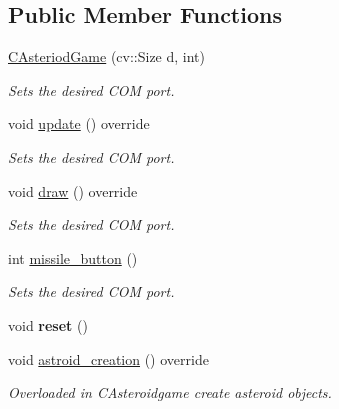 \subsection*{Public Member Functions}
\begin{DoxyCompactItemize}
\item 
\hyperlink{class_c_asteriod_game_afdff290987d441921d6549e8f6756b5d}{C\+Asteriod\+Game} (cv\+::\+Size d, int)
\begin{DoxyCompactList}\small\item\em Sets the desired C\+OM port. \end{DoxyCompactList}\item 
void \hyperlink{class_c_asteriod_game_abe38958a37bed1b2ed5f9b08bc0332bb}{update} () override
\begin{DoxyCompactList}\small\item\em Sets the desired C\+OM port. \end{DoxyCompactList}\item 
void \hyperlink{class_c_asteriod_game_a6c14d9f6671a0789b5738cdb5bc0af3a}{draw} () override
\begin{DoxyCompactList}\small\item\em Sets the desired C\+OM port. \end{DoxyCompactList}\item 
int \hyperlink{class_c_asteriod_game_ae0c06cee7387733f0ac1ec829a85b9a2}{missile\+\_\+button} ()
\begin{DoxyCompactList}\small\item\em Sets the desired C\+OM port. \end{DoxyCompactList}\item 
\hypertarget{class_c_asteriod_game_a6568a11921b87bf187c1e91adf3281e5}{}\label{class_c_asteriod_game_a6568a11921b87bf187c1e91adf3281e5} 
void {\bfseries reset} ()
\item 
void \hyperlink{class_c_asteriod_game_a787c6be5d95bc54c4c51b33f7da41b0a}{astroid\+\_\+creation} () override
\begin{DoxyCompactList}\small\item\em Overloaded in C\+Asteroidgame create asteroid objects. \end{DoxyCompactList}\end{DoxyCompactItemize}
